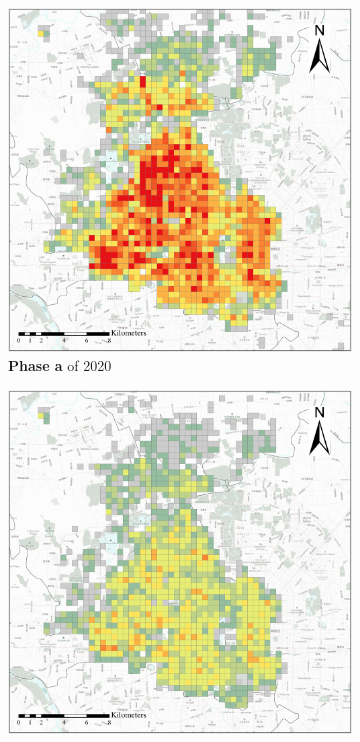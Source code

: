 \documentclass[preprints,article,accept,moreauthors,pdftex]{Definitions/mdpi}
\begin{document}
\begin{figure}[ht]
    \centering
    \begin{subfigure}{.28\textwidth}
        \includegraphics[width=\textwidth]{Figures/BSSPhase1_2020.eps}
        \caption{\textbf{Phase a} of 2020}\label{fig:p_a_2020}
    \end{subfigure}
    \begin{subfigure}{.28\textwidth}
        \includegraphics[width=\textwidth]{Figures/BSSPhase2_2020.eps}

\end{subfigure}
\end{figure}
\end{document}
